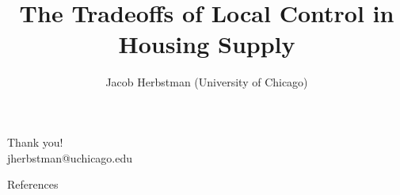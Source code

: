 \documentclass[11pt,notes=hide,aspectratio=169,mathserif]{beamer}
\title[Local Control]{The Tradeoffs of Local Control in Housing Supply}
\author[Jacob Herbstman]{Jacob Herbstman (University of Chicago)}
\date{\monthname[\the\month] \the\year}
\begin{document}
\begin{frame}[plain]
\titlepage
\note{
    \begin{itemize}
    \end{itemize}
}
\end{frame}









\begin{frame}[plain]
    \begin{center}
      {\LARGE Thank you!}\\[0.4em]
      {\large {jherbstman@uchicago.edu}}
    \end{center}
\end{frame}

\appendix

\begin{frame}[allowframebreaks]{References}
    \tiny
    
    
\end{frame}
\end{document}

